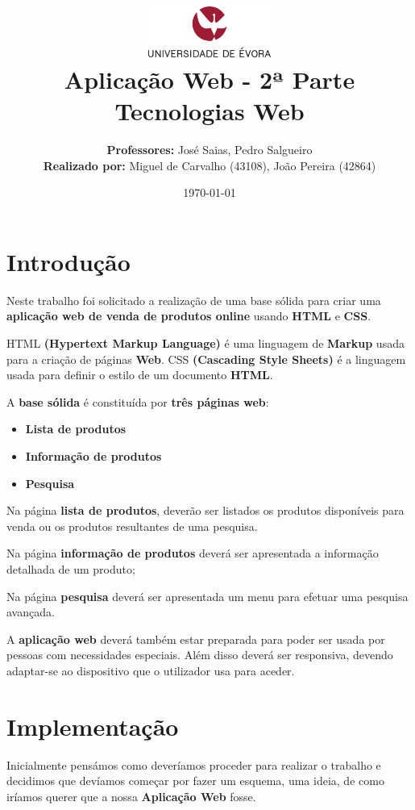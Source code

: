 \documentclass[11pt]{article}   %
\title
{
    \includegraphics[width=0.3\textwidth]{images/logo_universidade.png}
    \\[0.1cm]
    \textbf{Aplicação Web - 2ª Parte} \\
    Tecnologias Web
}
\author
{
    \textbf{Professores:} José Saias, Pedro Salgueiro \\
    \textbf{Realizado por:} Miguel de Carvalho (43108), João Pereira (42864) 
}
\date{\today}
\begin{document}
\maketitle

\section{Introdução} 

\hspace{0,5cm}Neste trabalho foi solicitado a realização de uma base sólida para criar uma 
\textbf{aplicação web de venda de produtos online} usando \textbf{HTML} e \textbf{CSS}. \par
HTML \textbf{(Hypertext Markup Language)} é uma linguagem de \textbf{Markup} usada para a criação de páginas \textbf{Web}.
CSS \textbf{(Cascading Style Sheets)} é a linguagem usada para definir o estilo de um documento \textbf{HTML}. \par
A \textbf{base sólida} é constituída por \textbf{três páginas web}:
\begin{itemize}
    \item \textbf{Lista de produtos} 
    \item \textbf{Informação de produtos} 
    \item \textbf{Pesquisa} 
\end{itemize}

Na página \textbf{lista de produtos}, deverão ser listados os produtos disponíveis para venda ou os produtos
resultantes de uma pesquisa.

Na página \textbf{informação de produtos} deverá ser apresentada a informação detalhada de um produto;

Na página \textbf{pesquisa} deverá ser apresentada um menu para efetuar uma pesquisa avançada.

A \textbf{aplicação web} deverá também estar preparada para poder ser usada por pessoas com necessidades especiais.
Além disso deverá ser responsiva, devendo adaptar-se ao dispositivo que o utilizador usa para aceder.
\section{Implementação}

\hspace{0,5cm}Inicialmente pensámos como deveríamos proceder para realizar o trabalho e decidimos que
devíamos começar por fazer um esquema, uma ideia, de como iríamos querer que a nossa \textbf{Aplicação Web} fosse.
\end{document}
